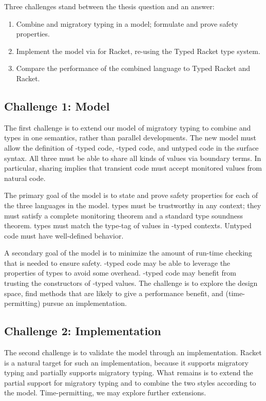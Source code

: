 Three challenges stand between the thesis question and an answer:

\begin{enumerate}
\item Combine \tdeep{} and \tshallow{} migratory typing in a model; formulate and prove safety properties.
\item Implement the model via for Racket, re-using the Typed Racket type system.
\item Compare the performance of the combined language to Typed Racket and Racket.
\end{enumerate}

\subsection{Challenge 1: Model}

The first challenge is to extend our model of migratory typing to combine
 \tdeep{} and \tshallow{} types in one semantics, rather than parallel
 developments.
The new model must allow the definition of \tdeep{}-typed code,
 \tshallow{}-typed code, and untyped code in the surface syntax.
All three must be able to share all kinds of values via boundary terms.
In particular, sharing implies that transient code must accept monitored
 values from natural code.
 
The primary goal of the model is to state and prove safety properties for each
 of the three languages in the model.
\tDeep{} types must be trustworthy in any context; they must satisfy a complete
 monitoring theorem and a standard type soundness theorem.
\tShallow{} types must match the type-tag of values in \tshallow{}-typed
 contexts.
Untyped code must have well-defined behavior.

A secondary goal of the model is to minimize the amount of run-time checking
 that is needed to ensure safety.
\tShallow{}-typed code may be able to leverage the properties of \tdeep{} types
 to avoid some overhead.
\tDeep{}-typed code may benefit from trusting the constructors of \tshallow{}-typed
 values.
The challenge is to explore the design space, find methods that are likely to
 give a performance benefit, and (time-permitting) pursue an implementation.


\subsection{Challenge 2: Implementation}

The second challenge is to validate the model through an implementation.
Racket is a natural target for such an implementation, because it supports
 \tdeep{} migratory typing and partially supports \tshallow{} migratory typing.
What remains is to extend the partial support for \tshallow{} migratory typing
 and to combine the two styles according to the model.
Time-permitting, we may explore further extensions.


